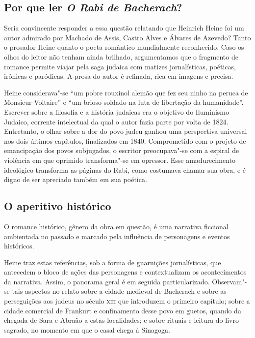 \documentclass[12pt]{extarticle}
\begin{document}
\subsection{Por que ler \textit{O Rabi de Bacherach}?}

Seria convincente responder a essa questão relatando que Heinrich Heine
foi um autor admirado por Machado de Assis, Castro Alves e Álvares de
Azevedo? Tanto o prosador Heine quanto o poeta romântico mundialmente
reconhecido. Caso os olhos do leitor não tenham ainda brilhado,
argumentamos que o fragmento de romance permite viajar pela saga judaica
com matizes jornalísticas, poéticas, irônicas e paródicas. A prosa do
autor é refinada, rica em imagens e precisa.

Heine considerava"-se ``um pobre rouxinol alemão que fez seu ninho na
peruca de Monsieur Voltaire'' e ``um brioso soldado na luta de
libertação da humanidade''. Escrever sobre a filosofia e a história
judaicas era o objetivo do Iluminismo Judaico, corrente intelectual da
qual o autor fazia parte por volta de 1824. Entretanto, o olhar sobre a
dor do povo judeu ganhou uma perspectiva universal nos dois últimos
capítulos, finalizados em 1840. Comprometido com o projeto de
emancipação dos povos subjugados, o escritor preocupava"-se com a espiral
de violência em que oprimido transforma"-se em opressor. Esse
amadurecimento ideológico transforma as páginas do Rabi, como costumava
chamar sua obra, e é digno de ser apreciado também em sua poética.

\subsection{O aperitivo histórico}

O romance histórico, gênero da obra em questão, é uma narrativa
ficcional ambientada no passado e marcado pela influência de personagens
e eventos históricos.

Heine traz estas referências, sob a forma de guarnições jornalísticas,
que antecedem o bloco de ações das personagens e contextualizam os
acontecimentos da narrativa. Assim, o panorama geral é em seguida
particularizado. Observam"-se tais aspectos no relato sobre a cidade
medieval de Bacherach e sobre as perseguições aos judeus no século \textsc{xiii}
que introduzem o primeiro capítulo; sobre a cidade comercial de Frankurt
e confinamento desse povo em guetos, quando da chegada de Sara e Abraão
a estas localidades; e sobre rituais e leitura do livro sagrado, no
momento em que o casal chega à Sinagoga.
\end{document}
